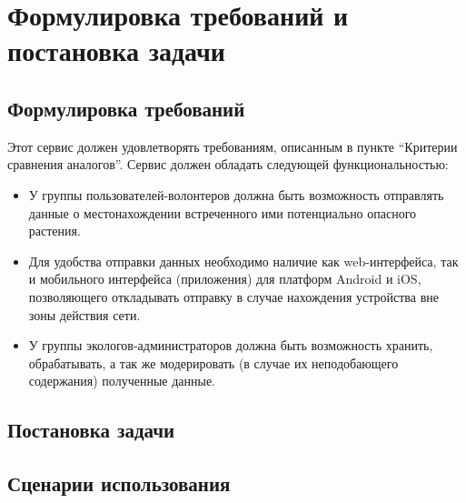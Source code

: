 \section{Формулировка требований и постановка задачи}

\subsection{Формулировка требований}

Этот сервис должен удовлетворять требованиям, описанным в пункте “Критерии сравнения аналогов”.
Сервис должен обладать следующей функциональностью:
\begin{itemize}[topsep=0pt, parsep=0pt, itemsep=0pt, wide=0.5cm]
	\item У группы пользователей-волонтеров должна быть возможность отправлять данные о местонахождении встреченного ими потенциально опасного растения.
	\item Для удобства отправки данных необходимо наличие как web-интерфейса, так и мобильного интерфейса (приложения) для платформ Android и iOS, позволяющего откладывать отправку в случае нахождения устройства вне зоны действия сети.
	\item У группы экологов-администраторов должна быть возможность хранить, обрабатывать, а так же модерировать (в случае их неподобающего содержания) полученные данные.
\end{itemize}

\subsection{Постановка задачи}

\subsection{Сценарии использования}

\tab
